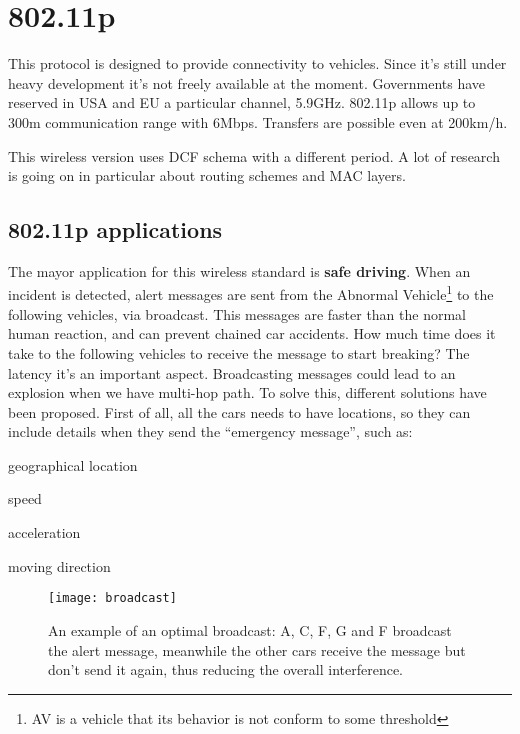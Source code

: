 \section{802.11p}

This protocol is designed to provide connectivity to vehicles. Since it's
still under heavy development it's not freely available at the moment.
Governments have reserved in USA and EU a particular channel, 5.9GHz. 802.11p
allows up to 300m communication range with 6Mbps. Transfers are possible
even at 200km/h.

This wireless version uses DCF schema with a different period. A lot of
research is going on in particular about routing schemes and MAC layers.

\subsection{802.11p applications}

The mayor application for this wireless standard is \textbf{safe driving}.
When an incident is detected, alert messages are sent from the Abnormal
Vehicle\footnote{AV is a vehicle that its behavior is not conform to some
threshold} to the following vehicles, via
broadcast. This messages are faster than the normal human reaction, and can
prevent chained car accidents. How much time does it take to the following
vehicles to receive the message to start breaking? The latency it's an important
aspect.
Broadcasting messages could lead to an explosion when we have multi-hop path.
To solve this, different solutions have been proposed.
First of all, all the cars needs to have locations, so they can include details
when they send the ``emergency message'', such as:
\begin{AutoMultiColItemize}
\item geographical location
\item speed
\item acceleration
\item moving direction
\end{AutoMultiColItemize}

\begin{figure}[t]
  \centering
  \texttt{[image: broadcast]}
  \caption[Optimal broadcast example]{
    An example of an optimal broadcast: A, C, F, G and F broadcast the alert
    message, meanwhile the other cars receive the message but don't send it
    again, thus reducing the overall interference.
  }
  \label{fig:802.11ws:broadcast}
\end{figure}

